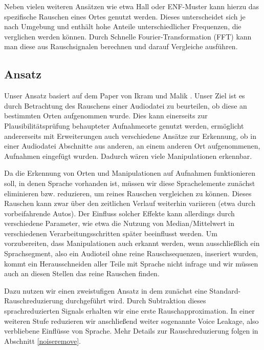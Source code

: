 \documentclass[
	fontsize=10.5pt,
	marginpar=false,
	ngerman,
	accentcolor=3d
	]{tudapub}
\begin{document}
Neben vielen weiteren Ansätzen wie etwa Hall oder ENF-Muster kann hierzu das spezifische Rauschen eines Ortes genutzt werden. Dieses unterscheidet sich je nach Umgebung und enthält hohe Anteile unterschiedlicher Frequenzen, die verglichen werden können. Durch Schnelle Fourier-Transformation (FFT) kann man diese aus Rauschsignalen berechnen und darauf Vergleiche ausführen.

\subsection{Ansatz}

Unser Ansatz basiert auf dem Paper von Ikram und Malik \cite{ikram_digital_2010}. Unser Ziel ist es durch Betrachtung des Rauschens einer Audiodatei zu beurteilen, ob diese an bestimmten Orten aufgenommen wurde. Dies kann einerseits zur Plausibilitätsprüfung behaupteter Aufnahmeorte genutzt werden, ermöglicht andererseits mit Erweiterungen auch verschiedene Ansätze zur Erkennung, ob in einer Audiodatei Abschnitte aus anderen, an einem anderen Ort aufgenommenen, Aufnahmen eingefügt wurden. Dadurch wären viele Manipulationen erkennbar.

Da die Erkennung von Orten und Manipulationen auf Aufnahmen funktionieren soll, in denen Sprache vorhanden ist, müssen wir diese Sprachelemente zunächst eliminieren bzw. reduzieren, um reines Rauschen vergleichen zu können. Dieses Rauschen kann zwar über den zeitlichen Verlauf weiterhin variieren (etwa durch vorbeifahrende Autos). Der Einfluss solcher Effekte kann allerdings durch verschiedene Parameter, wie etwa die Nutzung von Median/Mittelwert in verschiedenen Verarbeitungsschritten später beeinflusst werden. Um vorzubereiten, dass Manipulationen auch erkannt werden, wenn ausschließlich ein Sprachsegment, also ein Audioteil ohne reine Rauschsequenzen, inseriert wurden, kommt ein Herausschneiden aller Teile mit Sprache nicht infrage und wir müssen auch an diesen Stellen das reine Rauschen finden.

Dazu nutzen wir einen zweistufigen Ansatz in dem zunächst eine Standard-Rauschreduzierung durchgeführt wird. Durch Subtraktion dieses sprachreduzierten Signals erhalten wir eine erste Rauschapproximation. In einer weiteren Stufe reduzieren wir anschließend weiter sogenannte Voice Leakage, also verbliebene Einflüsse von Sprache. Mehr Details zur Rauschreduzierung folgen in Abschnitt \ref{noiseremove}.
\end{document}
